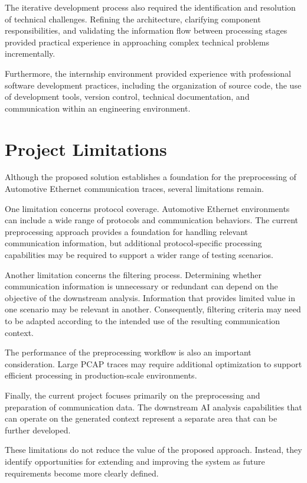 The iterative development process also required the identification and resolution of technical challenges. Refining the architecture, clarifying component responsibilities, and validating the information flow between processing stages provided practical experience in approaching complex technical problems incrementally.

Furthermore, the internship environment provided experience with professional software development practices, including the organization of source code, the use of development tools, version control, technical documentation, and communication within an engineering environment.

\section{Project Limitations}

Although the proposed solution establishes a foundation for the preprocessing of Automotive Ethernet communication traces, several limitations remain.

One limitation concerns protocol coverage. Automotive Ethernet environments can include a wide range of protocols and communication behaviors. The current preprocessing approach provides a foundation for handling relevant communication information, but additional protocol-specific processing capabilities may be required to support a wider range of testing scenarios.

Another limitation concerns the filtering process. Determining whether communication information is unnecessary or redundant can depend on the objective of the downstream analysis. Information that provides limited value in one scenario may be relevant in another. Consequently, filtering criteria may need to be adapted according to the intended use of the resulting communication context.

The performance of the preprocessing workflow is also an important consideration. Large PCAP traces may require additional optimization to support efficient processing in production-scale environments.

Finally, the current project focuses primarily on the preprocessing and preparation of communication data. The downstream AI analysis capabilities that can operate on the generated context represent a separate area that can be further developed.

These limitations do not reduce the value of the proposed approach. Instead, they identify opportunities for extending and improving the system as future requirements become more clearly defined.

